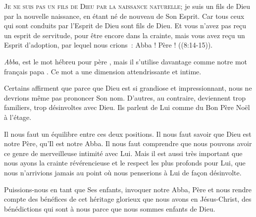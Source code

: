





\lettrine{J}{e ne suis pas un fils de Dieu par la naissance naturelle;}
 je suis un fils de Dieu par la nouvelle naissance, en étant né de nouveau
 de Son Esprit.
 \og Car tous ceux qui sont conduits par l'Esprit de Dieu sont fils de Dieu.
 Et vous n'avez pas reçu un esprit de servitude, pour être encore
 dans la crainte, mais vous avez reçu un Esprit d'adoption, par lequel
 nous crions~: \og Abba ! Père ! \fg{} ((8:14-15)).

\emph{Abba}, est le mot hébreu pour \og père \fg{},
 mais il s'utilise davantage comme notre mot français \og papa \fg{}.
 Ce mot a une dimension attendrissante et intime.


Certains affirment que parce que Dieu est si grandiose et impressionnant,
 nous ne devrions même pas prononcer Son nom. D'autres, au contraire,
 deviennent trop familiers, trop désinvoltes avec Dieu.
 Ils parlent de Lui comme du \og Bon Père Noël à l'étage. \fg{}

Il nous faut un équilibre entre ces deux positions.
 Il nous faut savoir que Dieu est notre Père, qu'Il est notre Abba.
 Il nous faut comprendre que nous pouvons avoir ce genre de merveilleuse
 intimité avec Lui. Mais il est aussi très important que nous ayons
 la crainte révérencieuse et le respect les plus profonds pour Lui,
 que nous n'arrivions jamais au point où nous penserions à Lui
 de façon désinvolte.

Puissions-nous en tant que Ses enfants, invoquer notre Abba,
 Père et nous rendre compte des bénéfices de cet héritage glorieux
 que nous avons en Jésus-Christ, des bénédictions qui sont à nous
 parce que nous sommes enfants de Dieu. 

\dvrule

